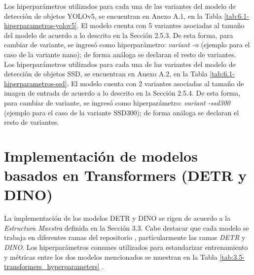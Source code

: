Los hiperparámetros utilizados para cada una de las variantes del modelo de detección de objetos YOLOv5, se encuentran en Anexo A.1, en la Tabla \ref{tab:6.1-hiperparametros-yolov5}. El modelo cuenta con 5 variantes asociadas al tamaño del modelo de acuerdo a lo descrito en la Sección 2.5.3. De esta forma, para cambiar de variante, se ingresó como hiperparámetro: \textit{variant -n} (ejemplo para el caso de la variante nano); de forma análoga se declaran el resto de variantes. \\

Los hiperparámetros utilizados para cada una de las variantes del modelo de detección de objetos SSD, se encuentran en Anexo A.2, en la Tabla \ref{tab:6.1-hiperparametros-ssd}. El modelo cuenta con 2 variantes asociadas al tamaño de imagen de entrada de acuerdo a lo descrito en la Sección 2.5.4. De esta forma, para cambiar de variante, se ingresó como hiperparámetro: \textit{variant -ssd300} (ejemplo para el caso de la variante SSD300); de forma análoga se declaran el resto de variantes.  \\



\section{Implementación de modelos basados en Transformers (DETR y DINO)}

La implementación de los modelos DETR y DINO se rigen de acuerdo a la \textit{Estructura Maestra} definida en la Sección 3.3. Cabe destacar que cada modelo se trabaja en diferentes ramas del repositorio \cite{repo_fernando2024}, particularmente las ramas \textit{DETR} y \textit{DINO}. Los hiperparámetros comunes utilizados para estandarizar entrenamiento y métricas entre los dos modelos mencionados se muestran en la Tabla \ref{tab:3.5-transformers_hyperparameters} .\\


